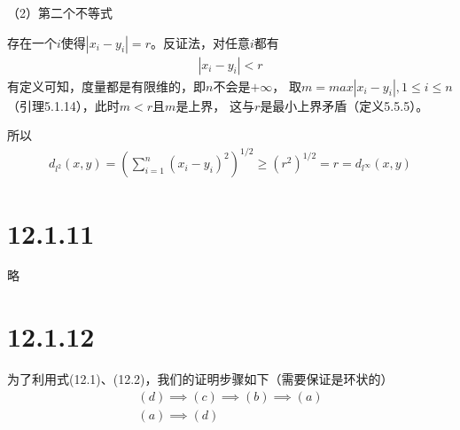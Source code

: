 \documentclass{article}
\begin{document}
（2）第二个不等式

存在一个$i$使得$|x_i - y_i| = r$。反证法，对任意$i$都有
\begin{align*}
      |x_i - y_i| < r
\end{align*}
有定义可知，度量都是有限维的，即$n$不会是$+\infty$，
取$m = max|x_i - y_i|, 1 \leq i \leq n$（引理5.1.14），此时$m < r$且$m$是上界，
这与$r$是最小上界矛盾（定义5.5.5）。

所以
\begin{align*}
      d_{l^2}(x, y) = \left(\sum \limits_{i = 1}^n (x_i - y_i)^2\right)^{1/2} \geq (r^2)^{1/2} = r = d_{l^\infty}(x, y)
\end{align*}



\section*{12.1.11}
略

\section*{12.1.12}

为了利用式(12.1)、(12.2)，我们的证明步骤如下（需要保证是环状的）
\begin{align*}
      (d) \implies (c) \implies (b) \implies (a) \\
      (a) \implies (d)
\end{align*}
\end{document}

